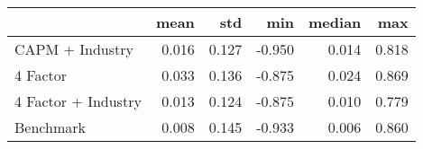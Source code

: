 \begin{tabular}{lrrrrr}
\toprule
{} &   mean &    std &    min &  median &    max \\
\midrule
 CAPM + Industry    &  0.016 &  0.127 & -0.950 &   0.014 &  0.818 \\
4 Factor            &  0.033 &  0.136 & -0.875 &   0.024 &  0.869 \\
4 Factor + Industry &  0.013 &  0.124 & -0.875 &   0.010 &  0.779 \\
Benchmark           &  0.008 &  0.145 & -0.933 &   0.006 &  0.860 \\
\bottomrule
\end{tabular}
